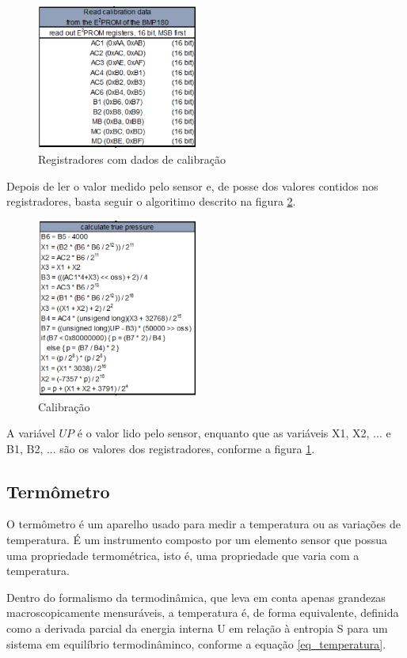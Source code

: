 \documentclass[twocolumn,11pt]{article}
\begin{document}
{\begin{figure}
  \includegraphics[width=200px]{calibracao_pressao_1.png}
  \caption{Registradores com dados de calibração}
  \label{calibracao_pressao_1}
\end{figure}

Depois de ler o valor medido pelo sensor e, de posse dos valores contidos nos registradores, basta seguir o algoritimo descrito na figura \ref{calibracao_pressao_2}.\par

\begin{figure}
  \includegraphics[width=200px]{calibracao_pressao_2.png}
  \caption{Calibração}
  \label{calibracao_pressao_2}
\end{figure}

A variável $UP$ é o valor lido pelo sensor, enquanto que as variáveis X1, X2, ... e B1, B2, ... são os valores dos registradores, conforme a figura \ref{calibracao_pressao_1}.\par

\subsection{Termômetro}\label{desenvolvimento_termometro}
O termômetro é um aparelho usado para medir a temperatura ou as variações de temperatura. É um instrumento composto por um elemento sensor que possua uma propriedade termométrica, isto é, uma propriedade que varia com a temperatura.\par
Dentro do formalismo da termodinâmica, que leva em conta apenas grandezas macroscopicamente mensuráveis, a temperatura é, de forma equivalente, definida como a derivada parcial da energia interna U em relação à entropia S para um sistema em equilíbrio termodinâminco, conforme a equação \ref{eq_temperatura}.\par

}
\end{document}
